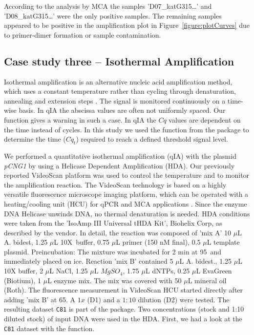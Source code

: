 According to the analysis by MCA the samples 'D07\_katG315\ldots' and 
'D08\_katG315\ldots' were the only positive samples. The remaining samples 
appeared to be positive in the amplification plot in 
Figure~\ref{figure:plotCurves} due to primer-dimer formation or sample 
contamination.

\subsection{Case study three -- Isothermal Amplification}

Isothermal amplification is an alternative nucleic acid amplification method, 
which uses a constant temperature rather than cycling through denaturation, 
annealing and extension steps \citep{rodiger_nucleic_2014}. The signal is 
monitored continuously on a time-wise basis. In qIA the abscissa values are often not 
uniformly spaced. Our  function gives a warning in such 
a case. In qIA the $Cq$ values are dependent on the time instead of cycles. In 
this study we used the  function from the  package 
to determine the time ($Cq_{t}$) required to reach a defined threshold signal 
level.

We performed a quantitative isothermal amplification (qIA) with the plasmid 
\textit{pCNG1} by using a Helicase Dependent Amplification (HDA). Our previously 
reported VideoScan platform \citep{rodiger_highly_2013} was used to control the 
temperature and to monitor the amplification reaction. The VideoScan technology 
is based on a highly versatile fluorescence microscope imaging platform, which 
can be operated with a heating/cooling unit (HCU) for qPCR and MCA applications 
\citep{roediger_RJ_2013, rodiger_highly_2013, Spiess_2014}. Since the enzyme DNA Helicase 
unwinds DNA, no thermal denaturation is needed. HDA conditions were taken 
from the 'IsoAmp III Universal tHDA Kit', Biohelix Corp, as described by the 
vendor. In detail, the reaction was composed of 'mix A' 10 $\mu$L A. bidest, 
1.25 $\mu$L 10X~buffer, 0.75 $\mu$L primer (150 nM final), 0.5 $\mu$L template 
plasmid. Preincubation: The mixture was incubated for 2 min at 
95\textcelsius~and immediately placed on ice. Reaction 'mix B' contained 5 
$\mu$L A. bidest., 1.25 $\mu$L 10X buffer, 2 $\mu$L NaCl, 1.25 $\mu$L 
$MgSO_{4}$, 1.75 $\mu$L dNTPs, 0.25 $\mu$L EvaGreen (Biotium), 1 $\mu$L enzyme 
mix. The mix was covered with 50 $\mu$L mineral oil (Roth). The fluorescence 
measurement in VideoScan HCU started directly after adding 'mix B' at 
65\textcelsius. A $1x$ (D1) and a $1:10$ dilution (D2) were tested. The 
resulting dataset \texttt{C81} is part of the  package. Two 
concentrations (stock and 1:10 diluted stock) of input DNA were used in the HDA. 
First, we had a look at the \texttt{C81} dataset with the  
function.

